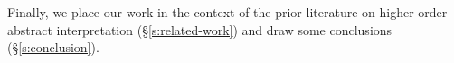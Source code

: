 Finally, we place our work in the context of the prior literature on
higher-order abstract interpretation (\S\ref{s:related-work}) and draw
some conclusions (\S\ref{s:conclusion}).






